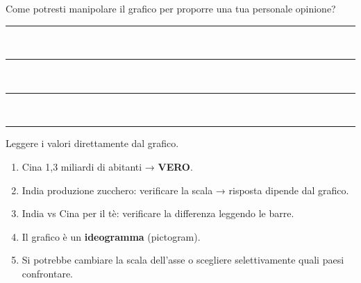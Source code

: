 \begin{question}[ID=1.4, subtitle={Lettura di ideogrammi con dati per paese}, tags={istogramma, grafici fuorvianti}, difficulty=facile]
\noindent
Come potresti manipolare il grafico per proporre una tua personale opinione?\vspace{10pt}\\
\rule{\linewidth}{0.2pt} \vspace{0.1pt} \\
\rule{\linewidth}{0.2pt} \vspace{0.1pt} \\
\rule{\linewidth}{0.2pt} \vspace{0.1pt} \\
\rule{\linewidth}{0.2pt} \vspace{0.1pt}
\begin{solution}
Leggere i valori direttamente dal grafico.
\begin{enumerate}
    \item Cina 1,3 miliardi di abitanti → \textbf{VERO}.
    \item India produzione zucchero: verificare la scala → risposta dipende dal grafico.
    \item India vs Cina per il tè: verificare la differenza leggendo le barre.
    \item Il grafico è un \textbf{ideogramma} (pictogram).
    \item Si potrebbe cambiare la scala dell'asse o scegliere selettivamente quali paesi confrontare.
\end{enumerate}
\end{solution}
\end{question}

